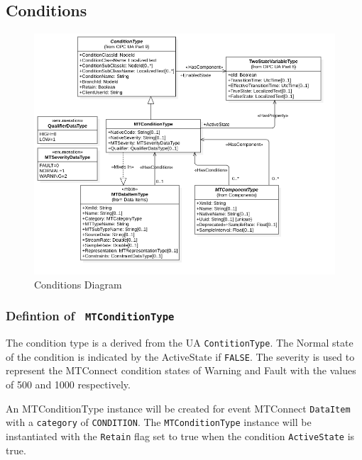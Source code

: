 \FloatBarrier
\subsection{Conditions} \label{model:Conditions}

\begin{figure}[ht]
  \centering
    \includegraphics[width=1.0\textwidth]{./diagrams/types/Conditions.png}
  \caption{Conditions Diagram}
  \label{fig:Conditions}
\end{figure}

\FloatBarrier




\subsubsection{Defintion of \texttt{ MTConditionType}}
  \label{type:MTConditionType}

\FloatBarrier

The condition type is a derived from the UA \texttt{ContitionType}. The Normal state of 
the condition is indicated by the ActiveState if \texttt{FALSE}. The severity 
is used to represent the MTConnect condition states of Warning and Fault with the values of
500 and 1000 respectively. 

An MTConditionType instance will be created for event MTConnect \texttt{DataItem} with a 
\texttt{category} of \texttt{CONDITION}. The \texttt{MTConditionType} instance will be instantiated 
with the \texttt{Retain} flag set to true when the condition \texttt{ActiveState} is true. 


